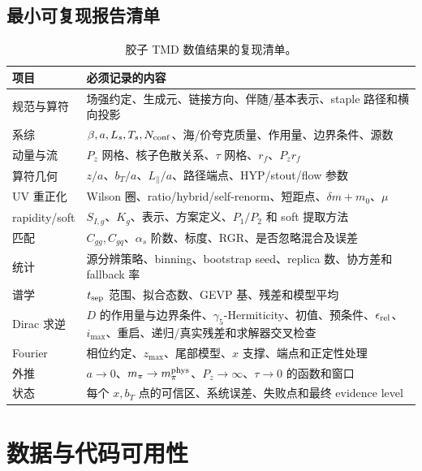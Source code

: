 \documentclass[UTF8,12pt,a4paper,twoside,openany]{ctexbook}
\begin{document}
\section{最小可复现报告清单}

\begin{table}[htbp]
\centering
\caption{胶子 TMD 数值结果的复现清单。}
\label{tab:repro-checklist}
\small
\begin{tabularx}{\textwidth}{L{3.3cm}Y}
\toprule
项目 & 必须记录的内容 \\
\midrule
规范与算符 & 场强约定、生成元、链接方向、伴随/基本表示、staple 路径和横向投影 \\
系综 & \(\beta,a,L_s,T_s,N_{\rm conf}\)、海/价夸克质量、作用量、边界条件、源数 \\
动量与流 & \(P_z\) 网格、核子色散关系、\(\tau\) 网格、\(r_f\)、\(P_zr_f\) \\
算符几何 & \(z/a\)、\(b_T/a\)、\(L_\parallel/a\)、路径端点、HYP/stout/flow 参数 \\
UV 重正化 & Wilson 圈、ratio/hybrid/self-renorm、短距点、\(\delta m+m_0\)、\(\mu\) \\
rapidity/soft & \(S_{I,g}\)、\(K_g\)、表示、方案定义、\(P_1/P_2\) 和 soft 提取方法 \\
匹配 & \(C_{gg},C_{gq}\)、\(\alpha_s\) 阶数、标度、RGR、是否忽略混合及误差 \\
统计 & 源分辨策略、binning、bootstrap seed、replica 数、协方差和 fallback 率 \\
谱学 & \(t_{\rm sep}\) 范围、拟合态数、GEVP 基、残差和模型平均 \\
Dirac 求逆 & \(D\) 的作用量与边界条件、\(\gamma_5\)-Hermiticity、初值、预条件、\(\epsilon_{\rm rel}\)、\(i_{\max}\)、重启、递归/真实残差和求解器交叉检查 \\
Fourier & 相位约定、\(z_{\max}\)、尾部模型、\(x\) 支撑、端点和正定性处理 \\
外推 & \(a\to0\)、\(m_\pi\to m_\pi^{\rm phys}\)、\(P_z\to\infty\)、\(\tau\to0\) 的函数和窗口 \\
状态 & 每个 \(x,b_T\) 点的可信区、系统误差、失败点和最终 evidence level \\
\bottomrule
\end{tabularx}
\end{table}

\clearpage
\chapter{数据与代码可用性}
\end{document}
